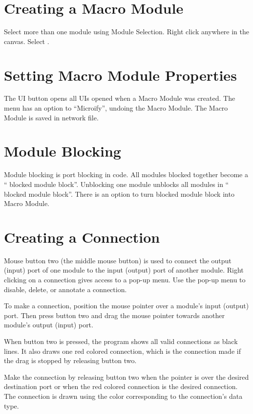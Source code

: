 \section{Creating a Macro Module}
\label{sec:macromods}

Select more than one module using Module Selection. Right click
anywhere in the canvas. Select . 

\section{Setting Macro Module Properties}

The UI button opens all UIs opened when a Macro Module was created. The
menu has an option to ``Microify'', undoing the Macro Module. The
Macro Module is saved in network file.

\section{Module Blocking}
\label{sec:modblocking}

Module blocking is port blocking in code. All modules blocked together
become a `` blocked module block''. Unblocking one module unblocks all
modules in `` blocked module block''. There is an option to turn blocked
module block into Macro Module.

\section{Creating a Connection}
\label{sec:connectmods}

Mouse button two (the middle mouse button) is used to connect the output
(input) port of one module to the input (output) port of another
module. Right clicking on a connection gives access to a pop-up
menu. Use the pop-up menu to disable, delete, or annotate a connection.

To make a connection, position the mouse pointer over a module's input
(output) port.  Then press button two and drag the mouse pointer towards
another module's output (input) port.

When button two is pressed, the program shows all valid connections as
black lines.  It also draws one red colored connection, which is the
connection made if  the drag is stopped by releasing 
button two.

Make the connection by releasing button two when the pointer is over
the desired destination port or when the red colored connection is the
desired connection.  The connection is drawn using the color
corresponding to the connection's data type.

